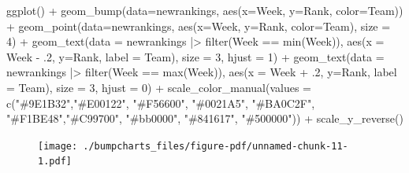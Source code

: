 \documentclass[
  letterpaper,
  DIV=11,
  numbers=noendperiod]{scrreprt}
\newenvironment{Shaded}{\begin{snugshade}}{\end{snugshade}}
\newcommand{\AttributeTok}[1]{\textcolor[rgb]{0.40,0.45,0.13}{#1}}
\newcommand{\DecValTok}[1]{\textcolor[rgb]{0.68,0.00,0.00}{#1}}
\newcommand{\FunctionTok}[1]{\textcolor[rgb]{0.28,0.35,0.67}{#1}}
\newcommand{\NormalTok}[1]{\textcolor[rgb]{0.00,0.23,0.31}{#1}}
\newcommand{\SpecialCharTok}[1]{\textcolor[rgb]{0.37,0.37,0.37}{#1}}
\newcommand{\StringTok}[1]{\textcolor[rgb]{0.13,0.47,0.30}{#1}}
\begin{document}
\begin{Shaded}
\begin{Highlighting}[]
\FunctionTok{ggplot}\NormalTok{() }\SpecialCharTok{+} 
  \FunctionTok{geom\_bump}\NormalTok{(}\AttributeTok{data=}\NormalTok{newrankings, }\FunctionTok{aes}\NormalTok{(}\AttributeTok{x=}\NormalTok{Week, }\AttributeTok{y=}\NormalTok{Rank, }\AttributeTok{color=}\NormalTok{Team)) }\SpecialCharTok{+} 
  \FunctionTok{geom\_point}\NormalTok{(}\AttributeTok{data=}\NormalTok{newrankings, }\FunctionTok{aes}\NormalTok{(}\AttributeTok{x=}\NormalTok{Week, }\AttributeTok{y=}\NormalTok{Rank, }\AttributeTok{color=}\NormalTok{Team), }\AttributeTok{size =} \DecValTok{4}\NormalTok{) }\SpecialCharTok{+}   
  \FunctionTok{geom\_text}\NormalTok{(}\AttributeTok{data =}\NormalTok{ newrankings }\SpecialCharTok{|\textgreater{}} \FunctionTok{filter}\NormalTok{(Week }\SpecialCharTok{==} \FunctionTok{min}\NormalTok{(Week)), }\FunctionTok{aes}\NormalTok{(}\AttributeTok{x =}\NormalTok{ Week }\SpecialCharTok{{-}}\NormalTok{ .}\DecValTok{2}\NormalTok{, }\AttributeTok{y=}\NormalTok{Rank, }\AttributeTok{label =}\NormalTok{ Team), }\AttributeTok{size =} \DecValTok{3}\NormalTok{, }\AttributeTok{hjust =} \DecValTok{1}\NormalTok{) }\SpecialCharTok{+}
  \FunctionTok{geom\_text}\NormalTok{(}\AttributeTok{data =}\NormalTok{ newrankings }\SpecialCharTok{|\textgreater{}} \FunctionTok{filter}\NormalTok{(Week }\SpecialCharTok{==} \FunctionTok{max}\NormalTok{(Week)), }\FunctionTok{aes}\NormalTok{(}\AttributeTok{x =}\NormalTok{ Week }\SpecialCharTok{+}\NormalTok{ .}\DecValTok{2}\NormalTok{, }\AttributeTok{y=}\NormalTok{Rank, }\AttributeTok{label =}\NormalTok{ Team), }\AttributeTok{size =} \DecValTok{3}\NormalTok{, }\AttributeTok{hjust =} \DecValTok{0}\NormalTok{) }\SpecialCharTok{+}
  \FunctionTok{scale\_color\_manual}\NormalTok{(}\AttributeTok{values =} \FunctionTok{c}\NormalTok{(}\StringTok{"\#9E1B32"}\NormalTok{,}\StringTok{"\#E00122"}\NormalTok{, }\StringTok{"\#F56600"}\NormalTok{, }\StringTok{"\#0021A5"}\NormalTok{, }\StringTok{"\#BA0C2F"}\NormalTok{, }\StringTok{"\#F1BE48"}\NormalTok{,}\StringTok{"\#C99700"}\NormalTok{, }\StringTok{"\#bb0000"}\NormalTok{, }\StringTok{"\#841617"}\NormalTok{, }\StringTok{"\#500000"}\NormalTok{)) }\SpecialCharTok{+}
  \FunctionTok{scale\_y\_reverse}\NormalTok{() }
\end{Highlighting}
\end{Shaded}

\begin{figure}[H]

{\centering \texttt{[image: ./bumpcharts\_files/figure-pdf/unnamed-chunk-11-1.pdf]}

}

\end{figure}
\end{document}
